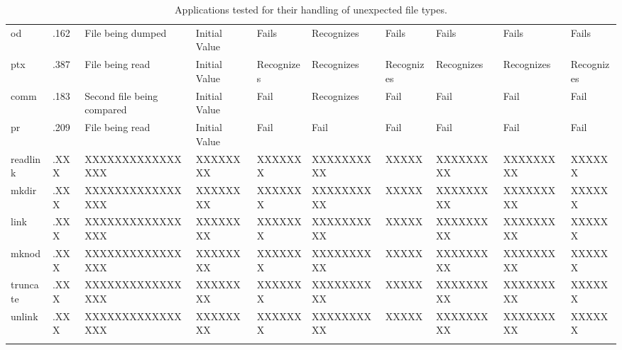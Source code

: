 \begin{table*}[t]
\begin{tabular}{l  l  l  |  l  l  l  l  l  l  l}
        od          & .162            & File being dumped          & Initial Value  & Fails          & Recognizes  & Fails      & Fails       & Fails      & Fails\\
        ptx         & .387            & File being read            & Initial Value  & Recognizes     & Recognizes  & Recognizes & Recognizes  & Recognizes & Recognizes\\
        comm        & .183            & Second file being compared & Initial Value  & Fail           & Recognizes  & Fail       & Fail        & Fail       & Fail\\
        pr          & .209            & File being read            & Initial Value  & Fail           & Fail        & Fail       & Fail        & Fail       & Fail\\
        readlink    & .XXX            & XXXXXXXXXXXXXXXX           & XXXXXXXX       & XXXXXXX        & XXXXXXXXXX  & XXXXX      & XXXXXXXXX   & XXXXXXXXX  & XXXXXX\\
        mkdir       & .XXX            & XXXXXXXXXXXXXXXX           & XXXXXXXX       & XXXXXXX        & XXXXXXXXXX  & XXXXX      & XXXXXXXXX   & XXXXXXXXX  & XXXXXX\\
        link        & .XXX            & XXXXXXXXXXXXXXXX           & XXXXXXXX       & XXXXXXX        & XXXXXXXXXX  & XXXXX      & XXXXXXXXX   & XXXXXXXXX  & XXXXXX\\
        mknod       & .XXX            & XXXXXXXXXXXXXXXX           & XXXXXXXX       & XXXXXXX        & XXXXXXXXXX  & XXXXX      & XXXXXXXXX   & XXXXXXXXX  & XXXXXX\\
        truncate    & .XXX            & XXXXXXXXXXXXXXXX           & XXXXXXXX       & XXXXXXX        & XXXXXXXXXX  & XXXXX      & XXXXXXXXX   & XXXXXXXXX  & XXXXXX\\
        unlink      & .XXX            & XXXXXXXXXXXXXXXX           & XXXXXXXX       & XXXXXXX        & XXXXXXXXXX  & XXXXX      & XXXXXXXXX   & XXXXXXXXX  & XXXXXX\\
    \bottomrule{}
    \end{tabular}
    \caption{Applications tested for their handling of unexpected file types.}
    \label{table:unexpectedtypes}
\end{table*}


